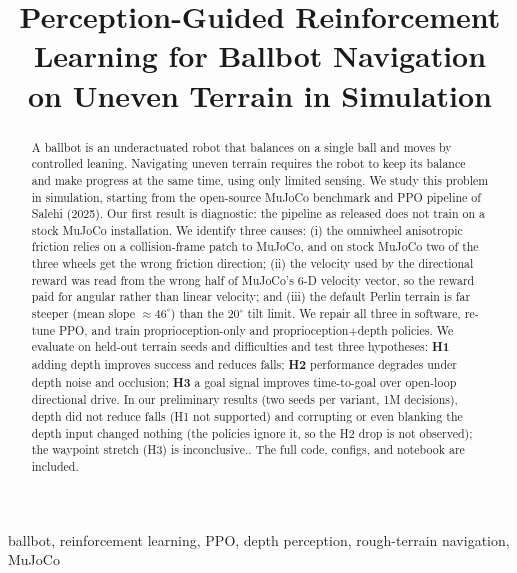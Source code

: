 \documentclass[conference]{IEEEtran}
\newcommand{\hyp}[1]{\textbf{#1}}
\begin{document}
\title{Perception-Guided Reinforcement Learning for Ballbot Navigation\\on Uneven Terrain in Simulation}
\author{
}
\maketitle

\begin{abstract}
A ballbot is an underactuated robot that balances on a single ball and moves by controlled leaning. Navigating uneven terrain requires the robot to keep its balance and make progress at the same time, using only limited sensing. We study this problem in simulation, starting from the open-source MuJoCo benchmark and PPO pipeline of Salehi (2025). Our first result is diagnostic: the pipeline as released does not train on a stock MuJoCo installation. We identify three causes: (i) the omniwheel anisotropic friction relies on a collision-frame patch to MuJoCo, and on stock MuJoCo two of the three wheels get the wrong friction direction; (ii) the velocity used by the directional reward was read from the wrong half of MuJoCo's 6-D velocity vector, so the reward paid for angular rather than linear velocity; and (iii) the default Perlin terrain is far steeper (mean slope $\approx 46^\circ$) than the $20^\circ$ tilt limit. We repair all three in software, re-tune PPO, and train proprioception-only and proprioception$+$depth policies. We evaluate on held-out terrain seeds and difficulties and test three hypotheses: \hyp{H1} adding depth improves success and reduces falls; \hyp{H2} performance degrades under depth noise and occlusion; \hyp{H3} a goal signal improves time-to-goal over open-loop directional drive. In our preliminary results (two seeds per variant, 1M decisions), depth did not reduce falls (H1 not supported) and corrupting or even blanking the depth input changed nothing (the policies ignore it, so the H2 drop is not observed); the waypoint stretch (H3) is inconclusive.. The full code, configs, and notebook are included.
\end{abstract}

\begin{IEEEkeywords}
ballbot, reinforcement learning, PPO, depth perception, rough-terrain navigation, MuJoCo
\end{IEEEkeywords}
\end{document}
